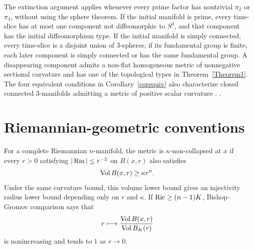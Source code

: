 \begin{remark}
\label{rem:extinction-remarks}

The extinction argument applies whenever every prime factor has nontrivial
$\pi_2$ or $\pi_3$, without using the sphere theorem. If the initial manifold
is prime, every time-slice has at most one component not diffeomorphic to
$S^3$, and that component has the initial diffeomorphism type. If the initial
manifold is simply connected, every time-slice is a disjoint union of
$3$-spheres; if its fundamental group is finite, each later component is
simply connected or has the same fundamental group. A disappearing component
admits a non-flat homogeneous metric of nonnegative sectional curvature and
has one of the topological types in Theorem~\ref{Theorem1}. The four equivalent
conditions in Corollary~\ref{corequiv} also characterize closed connected
$3$-manifolds admitting a metric of positive scalar curvature
\cite{SchoenYau2}.
\cite{AG,AG,CaoZhu,Cheeger,ChowKnopf,ChowLuNi,ColdingMinicozzi,ColdingMinicozzi,ColdingMinicozzi,GreeneWu,Gromov,Gromov,Hamilton3MPRC,Hamilton3MPRC,Hamilton3MPRC,Hamilton3MPRC,Hamilton3MPRC,Hamilton3MPRC,Hamilton4MPCO,Hamilton4MPIC,Hamilton4MPIC,HamiltonIFTNM,HamiltonNSRF3M,HamiltonNSRF3M,HamiltonNSRF3M,HamiltonNSRF3M,Hamiltonharnack,Hamiltonlimits,Hamiltonlimits,Hamiltonsurvey,Hamiltonsurvey,Hamiltonsurvey,Hempel,Jost,Kap,KleinerLott,KleinerLott,KleinerLott2,LiYau,Milnorsurvey,MorganTian2,Perelman1,Perelman1,Perelman2,Perelman2,Perelman2,Perelman2,Perelman2,Perelman2,Perelman3,Perelman3,Perelman3,Perelman3,Perelman3,Perelman3,Poincare,SPeters,STW,SY,SY,Scott,Shi1,Shi2,Thurstongeom,yuding}.
\end{remark}

\section{Riemannian-geometric conventions}

For a complete Riemannian $n$-manifold, the metric is
$\kappa$-non-collapsed at $x$ if every $r>0$ satisfying
$|\operatorname{Rm}|\leq r^{-2}$ on $B(x,r)$ also satisfies
\[
  \operatorname{Vol} B(x,r)\geq \kappa r^n.
\]
Under the same curvature bound, this volume lower bound gives an injectivity
radius lower bound depending only on $r$ and $\kappa$. If
$\operatorname{Ric}\geq(n-1)K$, Bishop--Gromov comparison says that
\[
  r\longmapsto
  \frac{\operatorname{Vol} B(x,r)}{\operatorname{Vol} B_K(r)}
\]
is nonincreasing and tends to $1$ as $r\to0$.

